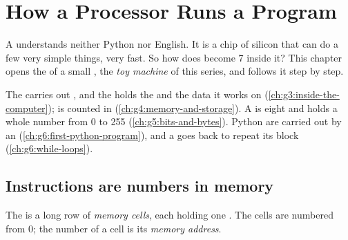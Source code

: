 \chapter{How a Processor Runs a Program}\label{ch:g7:how-a-processor-runs-a-program}

A  understands neither Python nor English. It is a chip of silicon
that can do a few very simple things, very fast. So how does 
become 7 inside it? This chapter opens the  of a small ,
the \emph{toy machine} of this series, and follows it step by step.

\begin{recall}
The  carries out , and the  holds the  and
the data it works on (\cref{ch:g3:inside-the-computer});  is counted in
 (\cref{ch:g4:memory-and-storage}). A  is eight  and holds a
whole number from 0 to 255 (\cref{ch:g5:bits-and-bytes}). Python  are
carried out by an  (\cref{ch:g6:first-python-program}), and a 
goes back to repeat its block (\cref{ch:g6:while-loops}).
\end{recall}

\section{Instructions are numbers in memory}

\begin{definition}\label{def:g7:how-a-processor-runs-a-program:cell}\label{def:g7:how-a-processor-runs-a-program:address}
The  is a long row of \emph{memory cells}, each
holding one . The cells are numbered from 0; the number of a cell is its
\emph{memory address}.
\end{definition}

